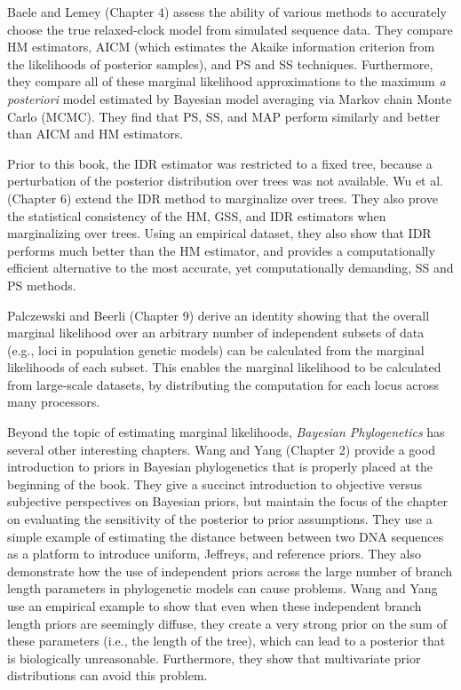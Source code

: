 \documentclass[letterpaper,12pt]{article}
\newcommand{\booktitle}{\textit{Bayesian Phylogenetics}\xspace}
\begin{document}
Baele and Lemey (Chapter 4) assess the ability of various methods to accurately
choose the true relaxed-clock model from simulated sequence data.
They compare HM estimators, AICM (which estimates the Akaike information criterion
from the likelihoods of posterior samples), and PS and SS techniques.
Furthermore, they compare all of these marginal likelihood approximations to
the maximum \emph{a posteriori} model estimated by Bayesian model averaging via
Markov chain Monte Carlo (MCMC).
They find that PS, SS, and MAP perform similarly and better than AICM
and HM estimators.

Prior to this book,
the IDR estimator was restricted to a fixed tree, because a perturbation of the
posterior distribution over trees was not available.
Wu et al. (Chapter 6) extend the IDR method to marginalize over trees.
They also prove the statistical consistency of the HM, GSS, and IDR estimators
when marginalizing over trees.
Using an empirical dataset, they also show that IDR performs much better than
the HM estimator, and provides a computationally efficient alternative to the
most accurate, yet computationally demanding, SS and PS methods.

Palczewski and Beerli (Chapter 9) derive an identity showing that the overall
marginal likelihood over an arbitrary number of independent subsets of 
data (e.g., loci in population genetic models) can be calculated from
the marginal likelihoods of each subset. 
This enables the marginal likelihood to be calculated from large-scale
datasets, by distributing the computation for each locus across many
processors.

Beyond the topic of estimating marginal likelihoods, \booktitle has several
other interesting chapters.
Wang and Yang (Chapter 2) provide a good introduction to priors in Bayesian
phylogenetics that is properly placed at the beginning of the book.
They give a succinct introduction to objective versus subjective perspectives
on Bayesian priors, but maintain the focus of the chapter on evaluating the
sensitivity of the posterior to prior assumptions.
They use a simple example of estimating the distance between between two DNA
sequences as a platform to introduce uniform, Jeffreys, and reference priors.
They also demonstrate how the use of independent priors across the
large number of branch length parameters in phylogenetic models can cause
problems.
Wang and Yang use an empirical example to show that even when these independent
branch length priors are seemingly diffuse, they create a very strong prior on
the sum of these parameters (i.e., the length of the tree), which can lead to a
posterior that is biologically unreasonable.
Furthermore, they show that multivariate prior distributions can avoid this
problem.
\end{document}
